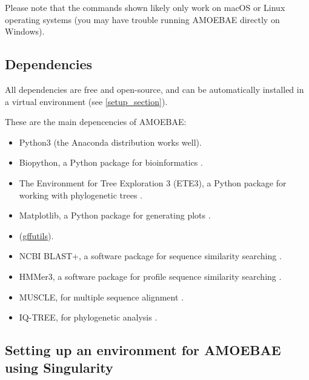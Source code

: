 \documentclass[12pt,letterpaper]{article}
\begin{document}
\begin{linenumbers}
Please note that the commands shown likely only work on macOS or Linux operating
systems (you may have trouble running AMOEBAE directly on Windows). 


\subsection{Dependencies}
\label{dependencies_section}

All dependencies are free and open-source, and can be automatically installed
in a virtual environment (see \autoref*{setup_section}).

These are the main depencencies of AMOEBAE:

\begin{itemize}

\item Python3 (the Anaconda distribution works well).

\item Biopython, a Python package for bioinformatics \citep{cock2009}.

\item The Environment for Tree Exploration 3 (ETE3), a Python package for
    working with phylogenetic trees \citep{huerta-cepas2016}.

\item Matplotlib, a Python package for generating plots \citep{hunter2007}.

\item (\href{https://pythonhosted.org/gffutils/}{gffutils}).

\item NCBI BLAST+, a software package for sequence similarity searching \citep{camacho2009}.

\item HMMer3, a software package for profile sequence similarity searching \citep{eddy1998}.

\item MUSCLE, for multiple sequence alignment \citep{edgar2004}.

\item IQ-TREE, for phylogenetic analysis \citep{nguyen2015}.


\end{itemize}


\subsection{Setting up an environment for AMOEBAE using Singularity}
\label{setup_section}


\end{linenumbers}
\end{document}
